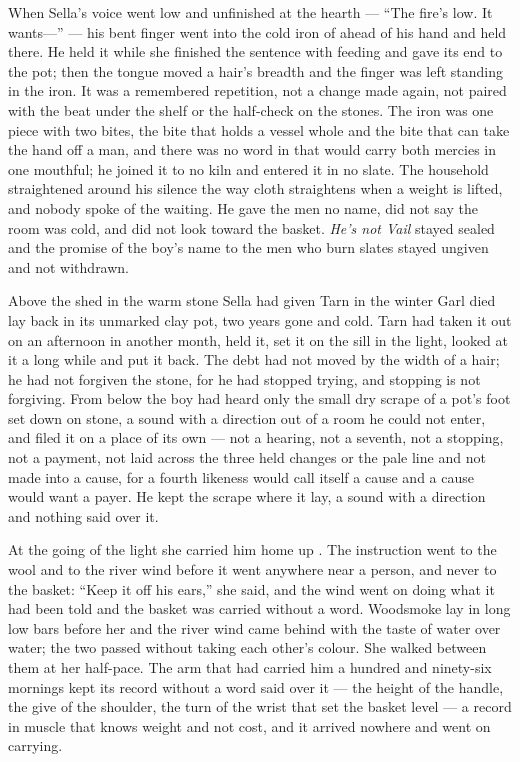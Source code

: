 When Sella's voice went low and unfinished at the hearth --- “The fire's low. It wants---” --- his bent finger went into the cold iron of  ahead of his hand and held there. He held it while she finished the sentence with feeding and gave its end to the pot; then the tongue moved a hair's breadth and the finger was left standing in the iron. It was a remembered repetition, not a change made again, not paired with the beat under the shelf or the half-check on the stones. The iron was one piece with two bites, the bite that holds a vessel whole and the bite that can take the hand off a man, and there was no word in  that would carry both mercies in one mouthful; he joined it to no kiln and entered it in no slate. The household straightened around his silence the way cloth straightens when a weight is lifted, and nobody spoke of the waiting. He gave the men no name, did not say the room was cold, and did not look toward the basket. \emph{He's not Vail} stayed sealed and the promise of the boy's name to the men who burn slates stayed ungiven and not withdrawn.

\scenebreak

Above the shed in  the warm stone Sella had given Tarn in the winter Garl died lay back in its unmarked clay pot, two years gone and cold. Tarn had taken it out on an afternoon in another month, held it, set it on the sill in the light, looked at it a long while and put it back. The debt had not moved by the width of a hair; he had not forgiven the stone, for he had stopped trying, and stopping is not forgiving. From below the boy had heard only the small dry scrape of a pot's foot set down on stone, a sound with a direction out of a room he could not enter, and filed it on a place of its own --- not a hearing, not a seventh, not a stopping, not a payment, not laid across the three held changes or the pale line and not made into a cause, for a fourth likeness would call itself a cause and a cause would want a payer. He kept the scrape where it lay, a sound with a direction and nothing said over it.

At the going of the light she carried him home up . The instruction went to the wool and to the river wind before it went anywhere near a person, and never to the basket: “Keep it off his ears,” she said, and the wind went on doing what it had been told and the basket was carried without a word. Woodsmoke lay in long low bars before her and the river wind came behind with the taste of water over water; the two passed without taking each other's colour. She walked between them at her half-pace. The arm that had carried him a hundred and ninety-six mornings kept its record without a word said over it --- the height of the handle, the give of the shoulder, the turn of the wrist that set the basket level --- a record in muscle that knows weight and not cost, and it arrived nowhere and went on carrying.

